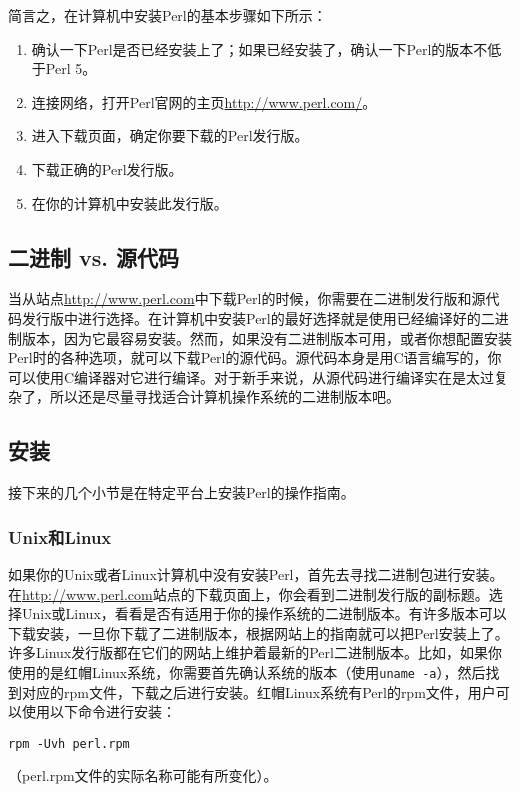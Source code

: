 简言之，在计算机中安装Perl的基本步骤如下所示：

\begin{enumerate}
  \item 确认一下Perl是否已经安装上了；如果已经安装了，确认一下Perl的版本不低于Perl 5。
  \item 连接网络，打开Perl官网的主页\href{http://www.perl.com/}{http://www.perl.com/}。
  \item 进入下载页面，确定你要下载的Perl发行版。
  \item 下载正确的Perl发行版。
  \item 在你的计算机中安装此发行版。
\end{enumerate}

\subsection{二进制 vs. 源代码}
当从站点\href{http://www.perl.com}{http://www.perl.com}中下载Perl的时候，你需要在二进制发行版和源代码发行版中进行选择。在计算机中安装Perl的最好选择就是使用已经编译好的二进制版本，因为它最容易安装。然而，如果没有二进制版本可用，或者你想配置安装Perl时的各种选项，就可以下载Perl的源代码。源代码本身是用C语言编写的，你可以使用C编译器对它进行编译。对于新手来说，从源代码进行编译实在是太过复杂了，所以还是尽量寻找适合计算机操作系统的二进制版本吧。

\subsection{安装}
接下来的几个小节是在特定平台上安装Perl的操作指南。

\subsubsection{Unix和Linux}
如果你的Unix或者Linux计算机中没有安装Perl，首先去寻找二进制包进行安装。在\href{http://www.perl.com}{http://www.perl.com}站点的下载页面上，你会看到二进制发行版的副标题。选择Unix或Linux，看看是否有适用于你的操作系统的二进制版本。有许多版本可以下载安装，一旦你下载了二进制版本，根据网站上的指南就可以把Perl安装上了。许多Linux发行版都在它们的网站上维护着最新的Perl二进制版本。比如，如果你使用的是红帽Linux系统，你需要首先确认系统的版本（使用\verb|uname -a|），然后找到对应的rpm文件，下载之后进行安装。红帽Linux系统有Perl的rpm文件，用户可以使用以下命令进行安装：

\noindent
\verb|rpm -Uvh perl.rpm|

\noindent
（perl.rpm文件的实际名称可能有所变化）。

